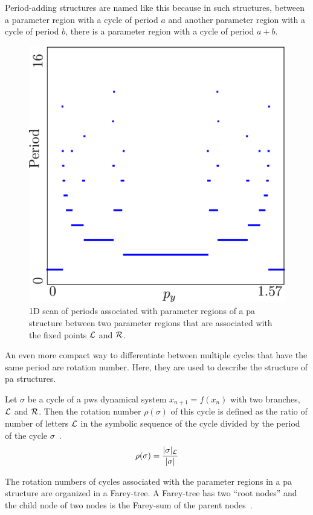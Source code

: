 Period-adding structures are named like this because in such structures, between a parameter region with a cycle of period $a$ and another parameter region with a cycle of period $b$, there is a parameter region with a cycle of period $a + b$.

\begin{figure}
	\centering
	\includegraphics[width=.5 \textwidth]{../Figures/2/2.1/result.png}
	\caption[1D scan of periods associated with parameter regions of a  structure between two parameter regions that are associated with the fixed points $\L$ and $\R$]{
		1D scan of periods associated with parameter regions of a \gls{pa} structure between two parameter regions that are associated with the fixed points $\L$ and $\R$.
	}
\end{figure}

An even more compact way to differentiate between multiple cycles that have the same period are rotation number.
Here, they are used to describe the structure of \gls{pa} structures.

\begin{definition}
	\label{def:rotation.numbers}
	Let $\sigma$ be a cycle of a \gls{pws} dynamical system $x_{n+1} = f(x_n)$ with two branches, $\L$ and $\R$.
	Then the rotation number $\rho(\sigma)$ of this cycle is defined as the ratio of number of letters $\L$ in the symbolic sequence of the cycle divided by the period of the cycle $\sigma$~\cite{Keener80}.
	\begin{align}
		\rho(\sigma) = \dfrac{|\sigma|_{\mathcal{L}}}{|\sigma|}
	\end{align}
\end{definition}

The rotation numbers of cycles associated with the parameter regions in a \gls{pa} structure are organized in a Farey-tree.
A Farey-tree has two ``root nodes'' and the child node of two nodes is the Farey-sum of the parent nodes~\cite{granados14adding}.

